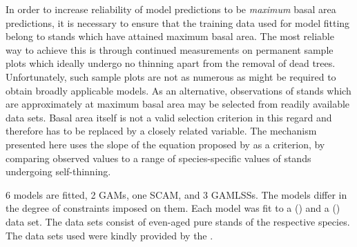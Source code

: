 In order to increase reliability of model predictions to be \emph{maximum} basal area predictions, it is necessary to ensure that the training data used for model fitting belong to stands which have attained maximum basal area.  The most reliable way to achieve this is through continued measurements on permanent sample plots which ideally undergo no thinning apart from the removal of dead trees.  Unfortunately, such sample plots are not as numerous as might be required to obtain broadly applicable models.  As an alternative, observations of stands which are approximately at maximum basal area may be selected from readily available data sets.  Basal area itself is not a valid selection criterion in this regard and therefore has to be replaced by a closely related variable.  The mechanism presented here uses the slope of the equation proposed by \textcite{Reineke1933} as a criterion, by comparing observed values to a range of species-specific values of stands undergoing self-thinning.

6 models are fitted, 2 GAMs, one SCAM, and 3 GAMLSSs.  The models differ in the degree of constraints imposed on them.  Each model was fit to a \BeechLong{} (\Beech{}) and a \SpruceLong{} (\Spruce{}) data set.  The data sets consist of even-aged pure stands of the respective species.  The data sets used were kindly provided by the \NWFVA{}.


